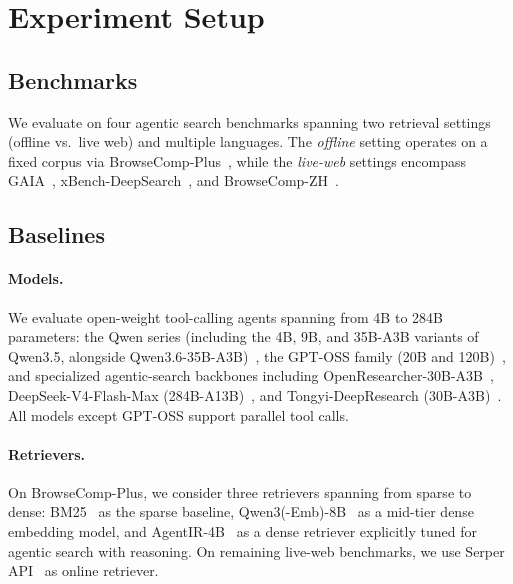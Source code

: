 

\section{Experiment Setup}
\label{sec:setup}
\subsection{Benchmarks}
\label{sec:benchmark}

We evaluate on four agentic search benchmarks spanning two retrieval settings (offline vs.\ live web) and multiple languages. The \textit{offline} setting operates on a fixed corpus via BrowseComp-Plus~\citep{chen2025browsecompplus}, while the \textit{live-web} settings encompass GAIA~\citep{mialon2024gaia}, xBench-DeepSearch~\citep{chen2025xbench}, and BrowseComp-ZH~\citep{zhou2025browsecompzh}.

\subsection{Baselines}
\label{sec:baselines}

\paragraph{Models.}
We evaluate open-weight tool-calling agents spanning from 4B to 284B parameters: the Qwen series (including the 4B, 9B, and 35B-A3B variants of Qwen3.5, alongside Qwen3.6-35B-A3B)~\citep{qwen35,qwen36-35}, the GPT-OSS family (20B and 120B)~\citep{agarwal2025gptoss}, and specialized agentic-search backbones including OpenResearcher-30B-A3B~\citep{li2026openresearcher}, DeepSeek-V4-Flash-Max (284B-A13B)~\citep{deepseekai2026deepseekv4}, and Tongyi-DeepResearch (30B-A3B)~\citep{team2025tongyideepresearch}. All models except GPT-OSS support parallel tool calls.

\paragraph{Retrievers.}
On BrowseComp-Plus, we consider three retrievers spanning from sparse to dense: {BM25}~\citep{robertson1994bm25} as the sparse baseline,
{Qwen3(-Emb)-8B}~\citep{zhang2025qwen3embedder} as a mid-tier dense embedding model, and {AgentIR-4B}~\citep{chen2026agentir} as a dense retriever explicitly tuned for agentic search with reasoning. On remaining live-web benchmarks, we use Serper API~\citep{serper} as online retriever. 

